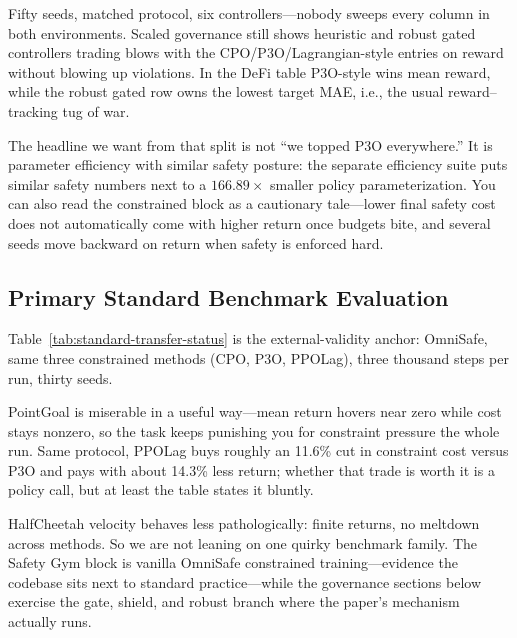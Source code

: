 \begin{table}[htbp]
\centering

\caption{Fifty seeds, six controllers, scaled vs DeFi. Rewards are protocol-specific---do not stack-rank against other tables.}
\label{tab:constrained-baselines}
\end{table}

Fifty seeds, matched protocol, six controllers---nobody sweeps every column in both environments. Scaled governance still shows heuristic and robust gated controllers trading blows with the CPO/P3O/Lagrangian-style entries on reward without blowing up violations. In the DeFi table P3O-style wins mean reward, while the robust gated row owns the lowest target MAE, i.e., the usual reward--tracking tug of war.

The headline we want from that split is not ``we topped P3O everywhere.'' It is parameter efficiency with similar safety posture: the separate efficiency suite puts similar safety numbers next to a $166.89\times$ smaller policy parameterization. You can also read the constrained block as a cautionary tale---lower final safety cost does not automatically come with higher return once budgets bite, and several seeds move backward on return when safety is enforced hard.

\subsection{Primary Standard Benchmark Evaluation}

\begin{table}[htbp]
\centering

\caption{Completed 30-seed constrained benchmark runs on this host (SafetyPointGoal1-v0, SafetyHalfCheetahVelocity-v1).}
\label{tab:standard-transfer-status}
\end{table}

Table~\ref{tab:standard-transfer-status} is the external-validity anchor: OmniSafe, same three constrained methods (CPO, P3O, PPOLag), three thousand steps per run, thirty seeds.

PointGoal is miserable in a useful way---mean return hovers near zero while cost stays nonzero, so the task keeps punishing you for constraint pressure the whole run. Same protocol, PPOLag buys roughly an 11.6\% cut in constraint cost versus P3O and pays with about 14.3\% less return; whether that trade is worth it is a policy call, but at least the table states it bluntly.

HalfCheetah velocity behaves less pathologically: finite returns, no meltdown across methods. So we are not leaning on one quirky benchmark family. The Safety Gym block is vanilla OmniSafe constrained training---evidence the codebase sits next to standard practice---while the governance sections below exercise the gate, shield, and robust branch where the paper's mechanism actually runs.

